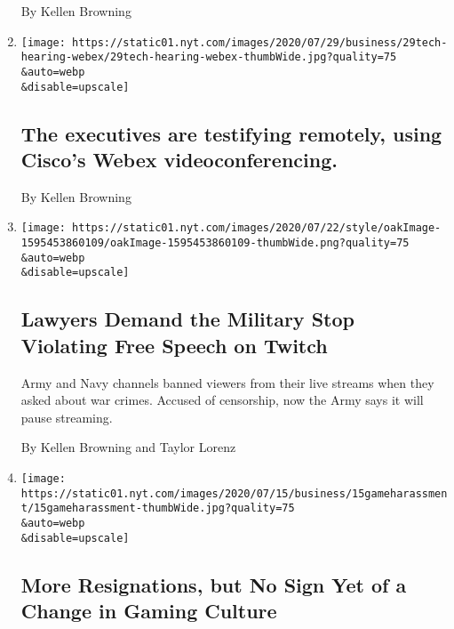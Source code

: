 \begin{enumerate}
  By Kellen Browning
\item
  \href{/live/2020/07/29/technology/tech-ceos-hearing-testimony/the-executives-are-testifying-remotely-using-ciscos-webex-videoconferencing}{}

  \texttt{[image: https://static01.nyt.com/images/2020/07/29/business/29tech-hearing-webex/29tech-hearing-webex-thumbWide.jpg?quality=75\\\&auto=webp\\\&disable=upscale]}

  \hypertarget{the-executives-are-testifying-remotely-using-ciscos-webex-videoconferencing}{%
  \subsection{The executives are testifying remotely, using Cisco's
  Webex
  videoconferencing.}\label{the-executives-are-testifying-remotely-using-ciscos-webex-videoconferencing}}

  By Kellen Browning
\item
  \href{/2020/07/22/style/army-gamers-war-crimes-first-amendment.html}{}

  \texttt{[image: https://static01.nyt.com/images/2020/07/22/style/oakImage-1595453860109/oakImage-1595453860109-thumbWide.png?quality=75\\\&auto=webp\\\&disable=upscale]}

  \hypertarget{lawyers-demand-the-military-stop-violating-free-speech-on-twitch}{%
  \subsection{Lawyers Demand the Military Stop Violating Free Speech on
  Twitch}\label{lawyers-demand-the-military-stop-violating-free-speech-on-twitch}}

  Army and Navy channels banned viewers from their live streams when
  they asked about war crimes. Accused of censorship, now the Army says
  it will pause streaming.

  By Kellen Browning and Taylor Lorenz
\item
  \href{/2020/07/19/technology/gaming-harassment.html}{}

  \texttt{[image: https://static01.nyt.com/images/2020/07/15/business/15gameharassment/15gameharassment-thumbWide.jpg?quality=75\\\&auto=webp\\\&disable=upscale]}

  \hypertarget{more-resignations-but-no-sign-yet-of-a-change-in-gaming-culture}{%
  \subsection{More Resignations, but No Sign Yet of a Change in Gaming
  Culture}\label{more-resignations-but-no-sign-yet-of-a-change-in-gaming-culture}}


\end{enumerate}
